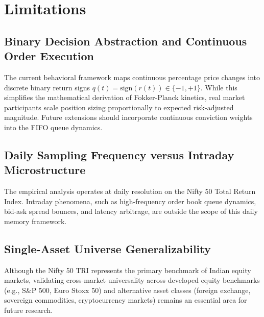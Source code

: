 \section{Limitations}

\subsection{Binary Decision Abstraction and Continuous Order Execution}
The current behavioral framework maps continuous percentage price changes into discrete binary return signs $q(t) = \text{sign}(r(t)) \in \{-1, +1\}$. While this simplifies the mathematical derivation of Fokker-Planck kinetics, real market participants scale position sizing proportionally to expected risk-adjusted magnitude. Future extensions should incorporate continuous conviction weights into the FIFO queue dynamics.

\subsection{Daily Sampling Frequency versus Intraday Microstructure}
The empirical analysis operates at daily resolution on the Nifty 50 Total Return Index. Intraday phenomena, such as high-frequency order book queue dynamics, bid-ask spread bounces, and latency arbitrage, are outside the scope of this daily memory framework.

\subsection{Single-Asset Universe Generalizability}
Although the Nifty 50 TRI represents the primary benchmark of Indian equity markets, validating cross-market universality across developed equity benchmarks (e.g., S\&P 500, Euro Stoxx 50) and alternative asset classes (foreign exchange, sovereign commodities, cryptocurrency markets) remains an essential area for future research.
